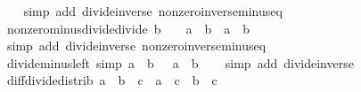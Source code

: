 \begin{isabellebody}
%
\isadelimproof
\ \ %
\endisadelimproof
%
\isatagproof
{}\isamarkupfalse%
\ {\isacharparenleft}{\kern0pt}simp\ add{\isacharcolon}{\kern0pt}\ divide{\isacharunderscore}{\kern0pt}inverse\ nonzero{\isacharunderscore}{\kern0pt}inverse{\isacharunderscore}{\kern0pt}minus{\isacharunderscore}{\kern0pt}eq{\isacharparenright}{\kern0pt}%
\endisatagproof
{\isafoldproof}%
%
\isadelimproof
\isanewline
%
\endisadelimproof
\isanewline
{}\isamarkupfalse%
\ nonzero{\isacharunderscore}{\kern0pt}minus{\isacharunderscore}{\kern0pt}divide{\isacharunderscore}{\kern0pt}divide{\isacharcolon}{\kern0pt}\ {\isachardoublequoteopen}b\ {\isasymnoteq}\ {}\ {\isasymLongrightarrow}\ {\isacharparenleft}{\kern0pt}{\isacharminus}{\kern0pt}a{\isacharparenright}{\kern0pt}\ {\isacharslash}{\kern0pt}\ {\isacharparenleft}{\kern0pt}{\isacharminus}{\kern0pt}b{\isacharparenright}{\kern0pt}\ {\isacharequal}{\kern0pt}\ a\ {\isacharslash}{\kern0pt}\ b{\isachardoublequoteclose}\isanewline
%
\isadelimproof
\ \ %
\endisadelimproof
%
\isatagproof
{}\isamarkupfalse%
\ {\isacharparenleft}{\kern0pt}simp\ add{\isacharcolon}{\kern0pt}\ divide{\isacharunderscore}{\kern0pt}inverse\ nonzero{\isacharunderscore}{\kern0pt}inverse{\isacharunderscore}{\kern0pt}minus{\isacharunderscore}{\kern0pt}eq{\isacharparenright}{\kern0pt}%
\endisatagproof
{\isafoldproof}%
%
\isadelimproof
\isanewline
%
\endisadelimproof
\isanewline
{}\isamarkupfalse%
\ divide{\isacharunderscore}{\kern0pt}minus{\isacharunderscore}{\kern0pt}left\ {\isacharbrackleft}{\kern0pt}simp{\isacharbrackright}{\kern0pt}{\isacharcolon}{\kern0pt}\ {\isachardoublequoteopen}{\isacharparenleft}{\kern0pt}{\isacharminus}{\kern0pt}a{\isacharparenright}{\kern0pt}\ {\isacharslash}{\kern0pt}\ b\ {\isacharequal}{\kern0pt}\ {\isacharminus}{\kern0pt}\ {\isacharparenleft}{\kern0pt}a\ {\isacharslash}{\kern0pt}\ b{\isacharparenright}{\kern0pt}{\isachardoublequoteclose}\isanewline
%
\isadelimproof
\ \ %
\endisadelimproof
%
\isatagproof
{}\isamarkupfalse%
\ {\isacharparenleft}{\kern0pt}simp\ add{\isacharcolon}{\kern0pt}\ divide{\isacharunderscore}{\kern0pt}inverse{\isacharparenright}{\kern0pt}%
\endisatagproof
{\isafoldproof}%
%
\isadelimproof
\isanewline
%
\endisadelimproof
\isanewline
{}\isamarkupfalse%
\ diff{\isacharunderscore}{\kern0pt}divide{\isacharunderscore}{\kern0pt}distrib{\isacharcolon}{\kern0pt}\ {\isachardoublequoteopen}{\isacharparenleft}{\kern0pt}a\ {\isacharminus}{\kern0pt}\ b{\isacharparenright}{\kern0pt}\ {\isacharslash}{\kern0pt}\ c\ {\isacharequal}{\kern0pt}\ a\ {\isacharslash}{\kern0pt}\ c\ {\isacharminus}{\kern0pt}\ b\ {\isacharslash}{\kern0pt}\ c{\isachardoublequoteclose}\isanewline

\end{isabellebody}
